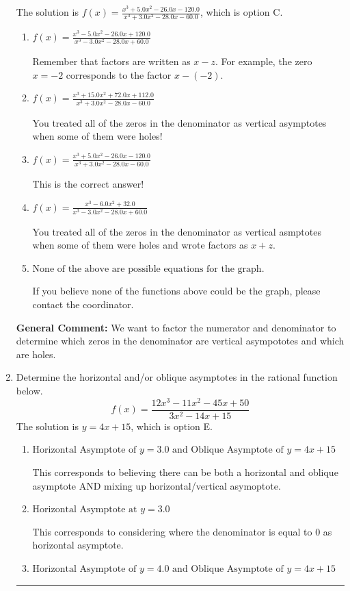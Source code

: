 \documentclass{extbook}[14pt]
\newcommand{\litem}[1]{\item #1

\rule{\textwidth}{0.4pt}}
\begin{document}
\begin{enumerate}
{The solution is \( f(x)=\frac{x^{3} +5.0 x^{2} -26.0 x -120.0}{x^{3} +3.0 x^{2} -28.0 x -60.0} \), which is option C.\begin{enumerate}[label=\Alph*.]
\item \( f(x)=\frac{x^{3} -5.0 x^{2} -26.0 x + 120.0}{x^{3} -3.0 x^{2} -28.0 x + 60.0} \)

Remember that factors are written as $x-z$. For example, the zero $x=-2$ corresponds to the factor $x-(-2)$.
\item \( f(x)=\frac{x^{3} +15.0 x^{2} +72.0 x + 112.0}{x^{3} +3.0 x^{2} -28.0 x -60.0} \)

You treated all of the zeros in the denominator as vertical asymptotes when some of them were holes!
\item \( f(x)=\frac{x^{3} +5.0 x^{2} -26.0 x -120.0}{x^{3} +3.0 x^{2} -28.0 x -60.0} \)

This is the correct answer!
\item \( f(x)=\frac{x^{3} -6.0 x^{2} + 32.0}{x^{3} -3.0 x^{2} -28.0 x + 60.0} \)

You treated all of the zeros in the denominator as vertical asmptotes when some of them were holes and wrote factors as $x+z$.
\item \( \text{None of the above are possible equations for the graph.} \)

If you believe none of the functions above could be the graph, please contact the coordinator.
\end{enumerate}

\textbf{General Comment:} We want to factor the numerator and denominator to determine which zeros in the denominator are vertical asympototes and which are holes.
}
\litem{
Determine the horizontal and/or oblique asymptotes in the rational function below.
\[ f(x) = \frac{12x^{3} -11 x^{2} -45 x + 50}{3x^{2} -14 x + 15} \]The solution is \( y = 4x + 15 \), which is option E.\begin{enumerate}[label=\Alph*.]
\item \( \text{Horizontal Asymptote of } y = 3.0 \text{ and Oblique Asymptote of } y = 4x + 15 \)

This corresponds to believing there can be both a horizontal and oblique asymptote AND mixing up horizontal/vertical asymoptote.
\item \( \text{Horizontal Asymptote at } y = 3.0 \)

This corresponds to considering where the denominator is equal to 0 as horizontal asymptote.
\item \( \text{Horizontal Asymptote of } y = 4.0 \text{ and Oblique Asymptote of } y = 4x + 15 \)


\end{enumerate}}
\end{enumerate}
\end{document}
